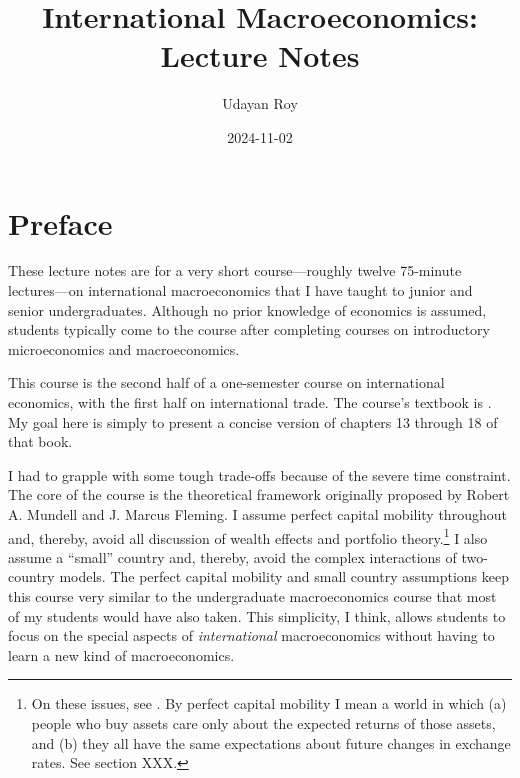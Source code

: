 \documentclass[
  letterpaper,
]{book}
\title{International Macroeconomics: Lecture Notes}
\author{Udayan Roy}
\date{2024-11-02}
\renewcommand*\contentsname{Table of contents}
\newcommand\contentsname{Table of contents}
\theoremstyle{plain}
\theoremstyle{remark}
\begin{document}
\frontmatter
\maketitle

\renewcommand*\contentsname{Table of contents}
{
\setcounter{tocdepth}{2}
\tableofcontents
}
\mainmatter
{}

\chapter*{Preface}\label{preface}


These lecture notes are for a very short course---roughly twelve
75-minute lectures---on international macroeconomics that I have taught
to junior and senior undergraduates. Although no prior knowledge of
economics is assumed, students typically come to the course after
completing courses on introductory microeconomics and macroeconomics.

This course is the second half of a one-semester course on international
economics, with the first half on international trade. The course's
textbook is \textcite{krugman2022international}. My goal here is simply
to present a concise version of chapters 13 through 18 of that book.

I had to grapple with some tough trade-offs because of the severe time
constraint. The core of the course is the theoretical framework
originally proposed by Robert A. Mundell and
J. Marcus Fleming. I assume perfect capital
mobility throughout and, thereby, avoid
all discussion of wealth effects and portfolio theory.\footnote{On these
  issues, see \textcite{rodseth2000open}. By perfect capital
  mobility I mean a world in which (a)
  people who buy assets care only about the expected returns of those
  assets, and (b) they all have the same expectations about future
  changes in exchange rates. See section XXX.} I also assume a ``small''
country and, thereby, avoid the complex interactions of two-country
models. The perfect capital mobility and small country assumptions keep
this course very similar to the undergraduate macroeconomics course that
most of my students would have also taken. This simplicity, I think,
allows students to focus on the special aspects of \emph{international}
macroeconomics without having to learn a new kind of macroeconomics.
\end{document}
